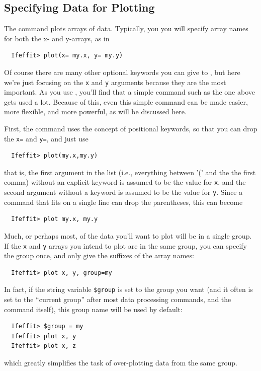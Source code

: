 \subsection{Specifying Data for Plotting} \label{Ch:Plot-xy}
{}
{}

The {} command plots arrays of data.  Typically, you you will
specify array names for both the x- and y-arrays, as in
\begin{verbatim}
  Ifeffit> plot(x= my.x, y= my.y)
\end{verbatim}
\noindent
Of course there are many other optional keywords you can give to
{}, but here we're just focusing on the {\tt{x}} and {\tt{y}}
arguments because they are the most important.  As you use {\ifeffit},
you'll find that a simple {} command such as the one above gets
used a lot.  Because of this, even this simple {} command can be
made easier, more flexible, and more powerful, as will be discussed here.

First, the {} command uses the concept of positional keywords,
so that you can drop the {\tt{x=}} and {\tt{y=}}, and just use
\begin{verbatim}
  Ifeffit> plot(my.x,my.y)
\end{verbatim}
\noindent
that is, the first argument in the list (i.e., everything between '(' and
the the first comma) without an explicit keyword is assumed to be the value
for {\tt{x}}, and the second argument without a keyword is assumed to be
the value for {\tt{y}}.  Since a command that fits on a single line can
drop the parentheses, this can become
\begin{verbatim}
  Ifeffit> plot my.x, my.y
\end{verbatim}
\noindent

Much, or perhaps most, of the data you'll want to plot will be in a single
group.  If the {\tt{x}} and {\tt{y}} arrays you intend to plot are in the
same group, you can specify the group once, and only give the suffixes of
the array names:
\begin{verbatim}
  Ifeffit> plot x, y, group=my
\end{verbatim}
\noindent
In fact, if the string variable {\tt{\$group}} is set to the group you want
(and it often is set to the ``current group'' after most data processing
commands, and the {} command itself), this group name will be
used by default:
\begin{verbatim}
  Ifeffit> $group = my
  Ifeffit> plot x, y
  Ifeffit> plot x, z
\end{verbatim}
\noindent %
which greatly simplifies the task of over-plotting data from the same group.

